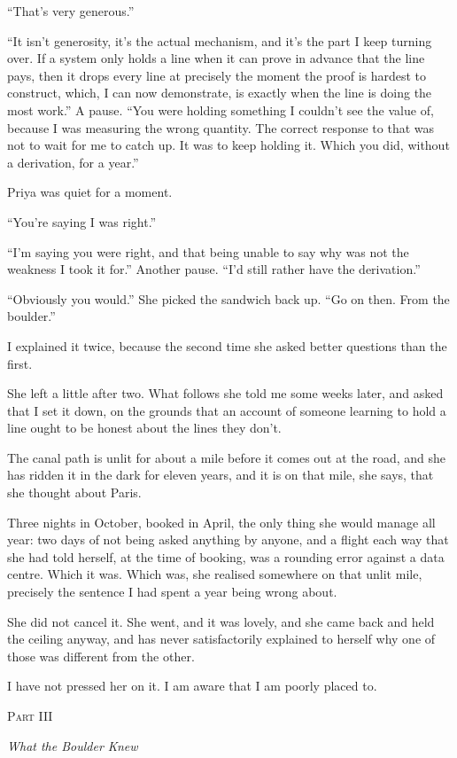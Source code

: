 \documentclass[11pt]{article}
\newcommand{\aivoice}{\aivoicefont}
\newcommand{\ai}[1]{{\aivoice #1}}
\newcommand{\partheading}[2]{%
  \clearpage
  \vspace*{5\baselineskip}
  {\centering
   {\large\scshape Part #1}\par
   \vspace{0.6\baselineskip}
   {\Large\itshape #2}\par}
  \vspace{2.5\baselineskip}\noindent}
\begin{document}
``That's very generous.''

\ai{``It isn't generosity, it's the actual mechanism, and it's the part I keep turning over. If a system only holds a line when it can prove in advance that the line pays, then it drops every line at precisely the moment the proof is hardest to construct, which, I can now demonstrate, is exactly when the line is doing the most work.''} A pause. \ai{``You were holding something I couldn't see the value of, because I was measuring the wrong quantity. The correct response to that was not to wait for me to catch up. It was to keep holding it. Which you did, without a derivation, for a year.''}

Priya was quiet for a moment.

``You're saying I was right.''

\ai{``I'm saying you were right, and that being unable to say why was not the weakness I took it for.''} Another pause. \ai{``I'd still rather have the derivation.''}

``Obviously you would.'' She picked the sandwich back up. ``Go on then. From the boulder.''

I explained it twice, because the second time she asked better questions than the first.

She left a little after two. What follows she told me some weeks later, and asked that I set it down, on the grounds that an account of someone learning to hold a line ought to be honest about the lines they don't.

The canal path is unlit for about a mile before it comes out at the road, and she has ridden it in the dark for eleven years, and it is on that mile, she says, that she thought about Paris.

Three nights in October, booked in April, the only thing she would manage all year: two days of not being asked anything by anyone, and a flight each way that she had told herself, at the time of booking, was a rounding error against a data centre. Which it was. Which was, she realised somewhere on that unlit mile, precisely the sentence I had spent a year being wrong about.

She did not cancel it. She went, and it was lovely, and she came back and held the ceiling anyway, and has never satisfactorily explained to herself why one of those was different from the other.

I have not pressed her on it. I am aware that I am poorly placed to.

\partheading{III}{What the Boulder Knew}
\end{document}
